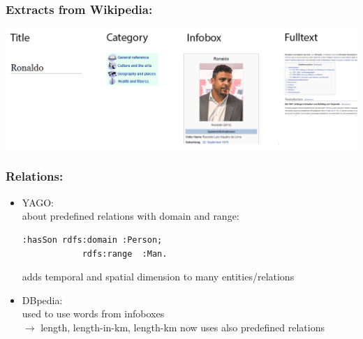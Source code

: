 \begin{frame}
\frametitle{Extracts from Wikipedia:}
\includegraphics[scale=0.25]{img/yago-figure3.png}
\end{frame}

\begin{frame}[fragile]
\frametitle{Relations:}
\begin{itemize}
\item YAGO:\\
about predefined relations with domain and range:\\
\begin{lstlisting}[frame=single]
:hasSon rdfs:domain :Person;
            rdfs:range  :Man.
\end{lstlisting}
adds temporal and spatial dimension to many entities/relations
\item DBpedia:\\
used to use words from infoboxes\\
$\rightarrow$ length, length-in-km, length-km
now uses also predefined relations
\end{itemize}
\end{frame}

